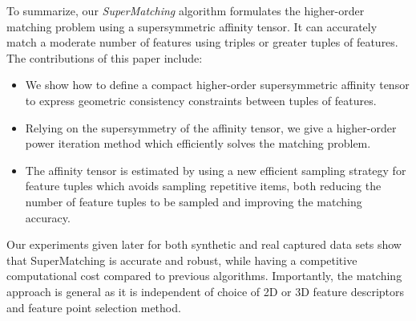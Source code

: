 To summarize, our \emph{SuperMatching} algorithm formulates the higher-order matching problem using a supersymmetric affinity tensor. It can accurately match a moderate number
of features using triples or greater tuples of features.
The contributions of this paper include:
\begin{itemize}
\item We show how to define a compact higher-order supersymmetric affinity tensor to express geometric consistency constraints between tuples of features.

\item Relying on the supersymmetry of the affinity tensor, we give a higher-order power iteration method which efficiently solves the matching problem.

\item The affinity tensor is estimated by using a
new efficient sampling strategy for feature tuples which avoids sampling repetitive items,  both reducing the number of feature tuples to be sampled and improving the matching accuracy.

\end{itemize}

Our experiments given later for both synthetic and real captured data sets show that SuperMatching is accurate and robust,
while having a competitive computational cost compared to previous algorithms.
Importantly, the matching approach is general as it is independent of choice of 2D or 3D feature descriptors and feature point selection method.

